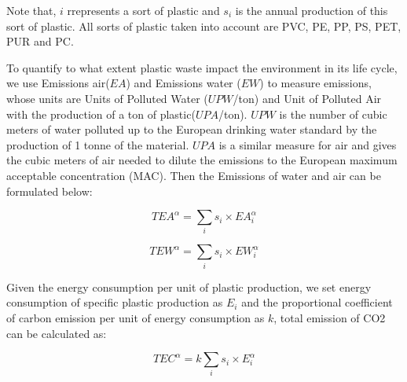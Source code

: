 \documentclass{mcmthesis}
\begin{document}
Note that, $i$ rrepresents a sort of plastic and $s_i$ is the annual production of this sort of plastic. All sorts of plastic taken into account are PVC, PE, PP, PS, PET, PUR and PC\cite{book}.

To quantify to what extent plastic waste impact the environment in its life cycle, we use Emissions air($EA$) and Emissions water ($EW$) to measure emissions, whose units are Units of Polluted Water ($UPW$/ton) and Unit of Polluted Air with the production of a ton of plastic($UPA$/ton). $UPW$ is the number of cubic meters of water polluted up to the European drinking water standard by the production of 1 tonne of the material. $UPA$ is a similar measure for air and gives the cubic meters of air needed to dilute the emissions to the European maximum acceptable concentration (MAC)\cite{book}. Then the Emissions of water and air can be formulated below:

\begin{equation}
TEA^{\alpha} = \sum_i{s_i}\times EA_i^\alpha
\label{EA}
\end{equation}

\begin{equation}
TEW^{\alpha} = \sum_i{s_i}\times EW_i^\alpha
\label{EW}
\end{equation}

Given the energy consumption per unit of plastic production, we set energy consumption of specific plastic production as $E_i$ and the proportional coefficient of carbon emission per unit of energy consumption as $k$, total emission of CO2 can be calculated as: 

\begin{equation}
TEC^\alpha = k\sum_i{s_i}\times E_i^\alpha
\label{EC}
\end{equation}




\end{document}
